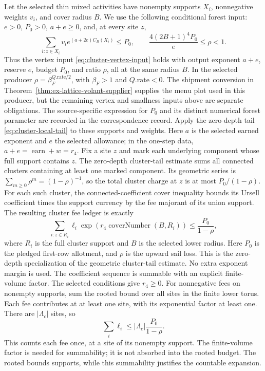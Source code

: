 Let the selected thin mixed activities have nonempty supports $X_i$, nonnegative weights $v_i$, and cover radius $B$. We use the following conditional forest input: $e>0$, $P_0>0$, $a+e\geq0$, and, at every site $z$,
\[
 \sum_{i:z\in X_i}v_i e^{(a+2e)C_B(X_i)}\leq P_0,
 \qquad \frac{4(2B+1)^4P_0}{e}\leq\rho<1.
\]
Thus the vertex input \eqref{eq:cluster-vertex-input} holds with output exponent $a+e$, reserve $e$, budget $P_0$, and ratio $\rho$, all at the same radius $B$. In the selected producer $\rho=\beta_F^{Q.\mathrm{rate}/2}$, with $\beta_F>1$ and $Q.\mathrm{rate}<0$. The shipment conversion in Theorem~\ref{thm:ex-lattice-volant-supplier} supplies the menu plot used in this producer, but the remaining vertex and smallness inputs above are separate obligations. The source-specific expression for $P_0$ and its distinct numerical forest parameter are recorded in the correspondence record. Apply the zero-depth tail \eqref{eq:cluster-local-tail} to these supports and weights.
Here $a$ is the selected earned exponent and $e$ the selected allowance;
in the one-step data, $a+e=\operatorname{earn}+w=r_4$. Fix a site $z$ and
mark each underlying component whose full support contains $z$. The
zero-depth cluster-tail estimate sums all connected clusters containing
at least one marked component. Its geometric series is
$\sum_{m\geq0}\rho^m=(1-\rho)^{-1}$, so the total cluster charge at $z$
is at most $P_0/(1-\rho)$. For each such cluster, the connected-coefficient
cover inequality bounds its Ursell coefficient times the support currency
by the fee majorant of its union support. The resulting cluster fee
ledger is exactly
\begin{equation}
 \sum_{i:z\in R_i}\ell_i
       \exp\!\left(r_4\operatorname{coverNumber}(B,R_i)\right)
 \leq \frac{P_0}{1-\rho},
 \label{eq:ex-lattice-multi-lucent}
\end{equation}
where $R_i$ is the full cluster support and $B$ is the selected lower
radius. Here $P_0$ is the pledged first-row allotment, and $\rho$ is the
upward sail loss. This is the zero-depth specialization of the geometric
cluster-tail estimate. No extra exponent margin is used.
The coefficient sequence is summable with an explicit finite-volume factor.
The selected conditions give $r_4\geq0$. For nonnegative fees on nonempty
supports, sum the rooted bound over all sites in the finite lower torus.
Each fee contributes at at least one site, with its exponential factor at
least one. There are $|\Lambda_c|$ sites, so
\[
 \sum_i\ell_i\leq |\Lambda_c|\frac{P_0}{1-\rho}.
\]
This counts each fee once, at a site of its nonempty support. The finite-volume
factor is needed for summability; it is not absorbed into the rooted budget.
The rooted bounds supports, while this summability justifies the
countable expansion.

